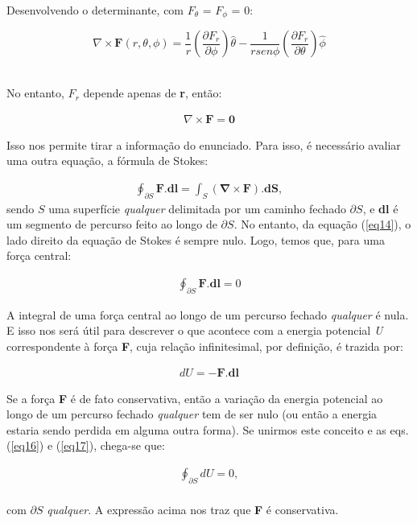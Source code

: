 Desenvolvendo o determinante, com $F_{\theta}$ = $F_{\phi}$ = 0:

\[
	\nabla \times \textbf{F} (r,\theta,\phi) = \frac{1}{r}\left(\frac{\partial F_r}{\partial \phi}\right)\hat{\theta} - \frac{1}{rsen\phi}\left(\frac{\partial F_r}{\partial \theta}\right)\hat{\phi}
\]
{\\}

No entanto, $F_r$ depende apenas de \textbf{r}, então:

\begin{eqnarray}
	\nabla \times \mathbf{F} = \mathbf{0} \label{eq14}
\end{eqnarray}

Isso nos permite tirar a informação do enunciado. Para isso, é necessário avaliar uma outra equação, a fórmula de Stokes:

\begin{eqnarray}
	\oint_{\partial S} \mathbf{F}.\mathbf{dl} = \int_S (\mathbf{\nabla \times F}).\mathbf{dS}, \label{eq15}
\end{eqnarray}
sendo $S$ uma superfície \textit{qualquer} delimitada por um caminho fechado $\partial S$, e \textbf{dl} é um segmento de percurso feito ao longo de $\partial S$. No entanto, da equação (\ref{eq14}), o lado direito da equação de Stokes é sempre nulo. Logo, temos que, para uma força central:

\begin{eqnarray}
	\oint_{\partial S} \mathbf{F}.\mathbf{dl} = 0 \label{eq16}
\end{eqnarray}

A integral de uma força central ao longo de um percurso fechado \textit{qualquer} é nula. E isso nos será útil para descrever o que acontece com a energia potencial \textit{U} correspondente à força \textbf{F}, cuja relação infinitesimal, por definição, é trazida por:

\begin{eqnarray}
	dU= - \mathbf{F}.\mathbf{dl}  \label{eq17}
\end{eqnarray}

Se a força \textbf{F} é de fato conservativa, então a variação da energia potencial ao longo de um percurso fechado \textit{qualquer} tem de ser nulo (ou então a energia estaria sendo perdida em alguma outra forma). Se unirmos este conceito e as eqs. (\ref{eq16}) e (\ref{eq17}), chega-se que:

\begin{eqnarray}
	\oint_{\partial S} dU = 0, \label{eq18}
\end{eqnarray}
{\\}com $\partial S$ \textit{qualquer}. A expressão acima nos traz que \textbf{F} é conservativa.

